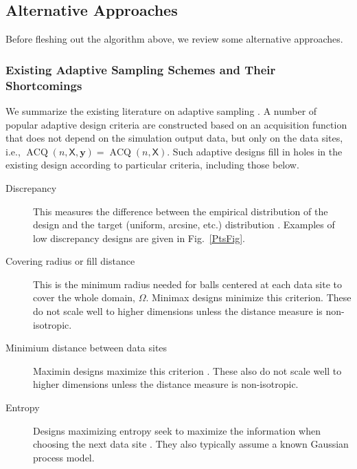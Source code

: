 \documentclass[11pt]{NSFamsart}
\DeclareMathOperator{\VAL}{ACQ}
\newcommand{\mX}{\mathsf{X}}
\newcommand{\by}{{\boldsymbol{y}}}
\begin{document}
\subsection{Alternative Approaches}
Before fleshing out the algorithm above, we review some alternative  approaches.

\subsubsection{Existing Adaptive Sampling Schemes and Their Shortcomings} \label{sec:shortExist}

We summarize the existing literature on adaptive sampling \cite{aute2013cross,burnaev2015adaptive,fu2017adaptive,gramacy2008adaptive,jin2002sequential,kleijnen2004application}. A number of popular adaptive design criteria are constructed based on an acquisition function that does not depend on the simulation output data, but only on the data sites, i.e., $\VAL(n,\mX,\by) = \VAL(n,\mX)$. Such adaptive designs fill in holes in the existing design according to particular criteria, including those below. 
\begin{description}
	\item[Discrepancy] This measures the difference between the empirical distribution of the design and the target (uniform, arcsine, etc.) distribution \cite{FangEtal19a}. Examples of low discrepancy designs are given in Fig.\ \ref{PtsFig}. 
	\item[Covering radius or fill distance] This is the minimum radius needed for balls centered at each data site to cover the whole domain, $\Omega$. Minimax designs minimize this criterion.  These do not scale well to higher dimensions unless the distance measure is non-isotropic.
	\item[Minimium distance between data sites] Maximin designs maximize this criterion \cite{jin2002sequential}.  These also do not scale well to higher dimensions unless the distance measure is non-isotropic.
	\item[Entropy] Designs maximizing entropy seek to maximize the information when choosing the next data site \cite{jin2002sequential}. They also typically assume a known Gaussian process model.
\end{description}
\end{document}
